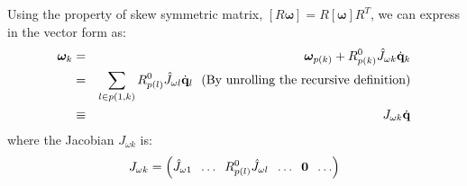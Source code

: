 Using the property of skew symmetric matrix, $[R \bm{\omega}] = R [\bm{\omega}]
R^T$, we can express  in the vector form as:
\begin{eqnarray}
\label{eq:angvelk_iterative}
\nonumber
\bm{\omega}_k & = & \bm{\omega}_{p(k)} + R^0_{p(k)} \hat{J}_{\omega k} \dot{\mathbf{q}}_k\\
\nonumber
& = & \sum_{l \in p(1,k)} R^0_{p(l)} \hat{J}_{\omega l} \dot{\mathbf{q}}_l \mbox{\ \ (By unrolling the recursive definition)}\\
& \equiv & J_{\omega k}\dot{\mathbf{q}}
\end{eqnarray}
where the Jacobian $J_{\omega k}$ is:
\begin{equation}
\label{eq:angular_velocity_jac_link}
J_{\omega k} = \left ( \hat{J}_{\omega 1}\;\; \hdots\;\; R^0_{p(l)} \hat{J}_{\omega l} \;\;\hdots\;\; \mathbf{0} \;\;\hdots \right )
\end{equation}


